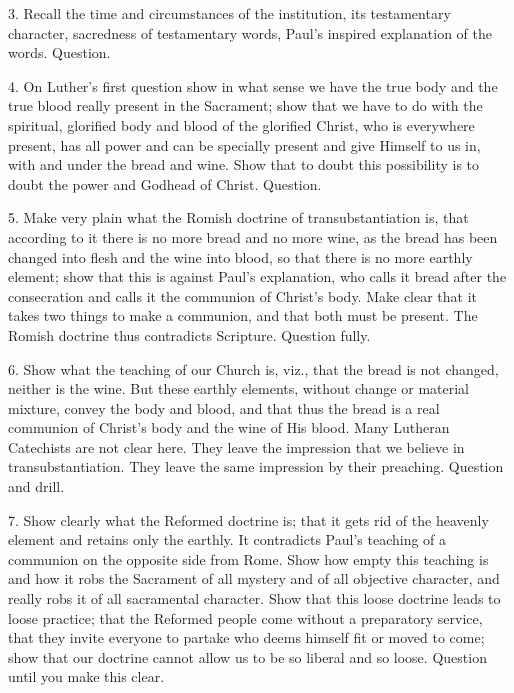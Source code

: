 3. Recall the time and circumstances of the institution, its testamentary character, sacredness of testamentary words, Paul’s inspired explanation of the words. Question. 

4. On Luther’s first question show in what sense we have the true body and the true blood really present in the Sacrament; show that we have to do with the spiritual, glorified body and blood of the glorified Christ, who is everywhere present, has all power and can be specially present and give Himself to us in, with and under the bread and wine. Show that to doubt this possibility is to doubt the power and Godhead of Christ. Question.

5. Make very plain what the Romish doctrine of transubstantiation is, that according to it there is no more bread and no more wine, as the bread has been changed into flesh and the wine into blood, so that
there is no more earthly element; show that this is against Paul’s explanation, who calls it bread after the consecration and calls it the communion of Christ’s body. Make clear that it takes two things to make a communion, and that both must be present. The Romish doctrine thus contradicts Scripture. Question fully. 

6. Show what the teaching of our Church is, viz., that the bread is not changed, neither is the wine. But these earthly elements, without change or material mixture, convey the body and blood, and that thus the bread is a real communion of Christ’s body and the wine of His blood. Many Lutheran Catechists are not clear here. They leave the impression that we believe in transubstantiation. They leave the same impression by their preaching. Question and drill. 

7. Show clearly what the Reformed doctrine is; that it gets rid of the heavenly element and retains only the earthly. It contradicts Paul’s teaching of a communion on the opposite side from Rome. Show how empty this teaching is and how it robs the Sacrament of all mystery and of all objective character, and really robs it of all sacramental character. Show that this loose doctrine leads to loose practice; that the Reformed people come without a preparatory service, that they invite everyone to partake who deems himself fit or moved to come; 
show that our doctrine cannot allow us to be so liberal and so loose. Question until you make this clear.

